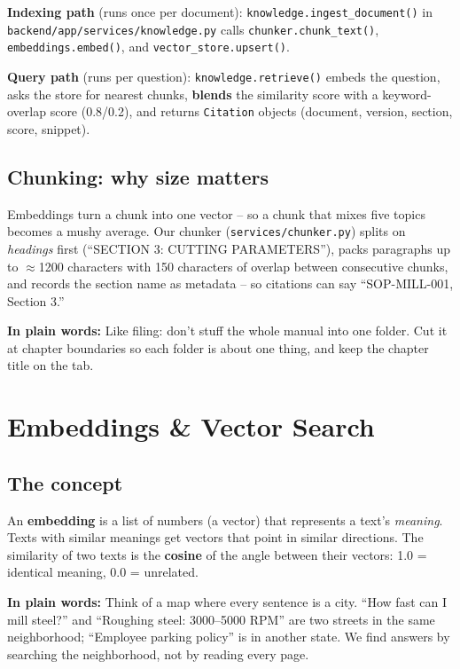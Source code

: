 \documentclass[11pt,a4paper]{article}
\newcommand{\layman}[1]{\par\medskip\noindent\textcolor{layman}{\textbf{In plain words:}} #1\par\smallskip}
\newcommand{\codefile}[1]{\texttt{\small #1}}
\begin{document}
\textbf{Indexing path} (runs once per document):
\codefile{knowledge.ingest\_document()} in \codefile{backend/app/services/knowledge.py}
calls \codefile{chunker.chunk\_text()}, \codefile{embeddings.embed()}, and
\codefile{vector\_store.upsert()}.

\textbf{Query path} (runs per question): \codefile{knowledge.retrieve()} embeds the
question, asks the store for nearest chunks, \textbf{blends} the similarity score with
a keyword-overlap score (0.8/0.2), and returns \codefile{Citation} objects
(document, version, section, score, snippet).

\subsection{Chunking: why size matters}
Embeddings turn a chunk into one vector -- so a chunk that mixes five topics becomes a
mushy average. Our chunker (\codefile{services/chunker.py}) splits on \emph{headings}
first (``SECTION 3: CUTTING PARAMETERS''), packs paragraphs up to $\approx$1200
characters with 150 characters of overlap between consecutive chunks, and records the
section name as metadata -- so citations can say ``SOP-MILL-001, Section 3.''

\layman{Like filing: don't stuff the whole manual into one folder. Cut it at chapter
boundaries so each folder is about one thing, and keep the chapter title on the tab.}

\section{Embeddings \& Vector Search}

\subsection{The concept}
An \textbf{embedding} is a list of numbers (a vector) that represents a text's
\emph{meaning}. Texts with similar meanings get vectors that point in similar
directions. The similarity of two texts is the \textbf{cosine} of the angle between
their vectors: 1.0 = identical meaning, 0.0 = unrelated.

\layman{Think of a map where every sentence is a city. ``How fast can I mill steel?''
and ``Roughing steel: 3000--5000 RPM'' are two streets in the same neighborhood;
``Employee parking policy'' is in another state. We find answers by searching the
neighborhood, not by reading every page.}
\end{document}
